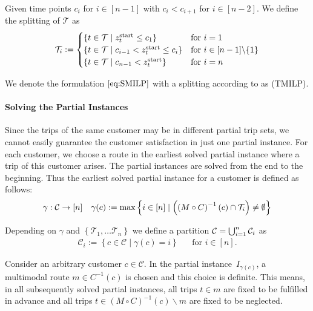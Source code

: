 \begin{definition}
\label{def:time_dependent_splitting}

Given time points $c_i$ for $i\in[n-1]$ with $c_i<c_{i+1}$ for $i\in[n-2]$. We define the splitting of $\mathcal{T}$ as
\begin{align*}
	\mathcal{T}_i := \begin{cases}
		\left\{t\in\mathcal{T}\mid z^{\operatorname{start}}_t\leq c_1\right\} & \text{for } i=1 \\
		\left\{t\in\mathcal{T}\mid c_{i-1}<z^{\operatorname{start}}_t\leq c_i\right\} & \text{for } i\in[n-1]\backslash\{1\} \\
		\left\{t\in\mathcal{T}\mid c_{n-1}<z^{\operatorname{start}}_t\right\} & \text{for } i=n
	\end{cases}
\end{align*}

\end{definition}

We denote the formulation $\eqref{eq:SMILP}$ with a splitting according to  as (TMILP).

\paragraph{Solving the Partial Instances} \parfill

Since the trips of the same customer may be in different partial trip sets, we cannot easily guarantee the customer satisfaction in just one partial instance. For each customer, we choose a route in the earliest solved partial instance where a trip of this customer arises. The partial instances are solved from the end to the beginning. Thus the earliest solved partial instance for a customer is defined as follows:
\begin{align*}
	\gamma: \mathcal{C}\to[n] && \gamma(c) := \max\left\{i\in[n]\mid\left(\left(M\circ C\right)^{-1}(c)\cap\mathcal{T}_i\right)\neq\emptyset\right\}
\end{align*}

Depending on $\gamma$ and $\left\{\mathcal{T}_1,\dots\mathcal{T}_n\right\}$ we define a partition ${\mathcal{C}=\bigcup_{i=1}^n \mathcal{C}_i}$ as
\begin{align*}
	\mathcal{C}_i := \left\{c\in\mathcal{C}\mid \gamma(c)=i\right\} && \text{for } i\in[n].
\end{align*}

Consider an arbitrary customer $c\in\mathcal{C}$. In the partial instance~$I_{\gamma(c)}$, a multimodal route $m\in C^{-1}(c)$ is chosen and this choice is definite. This means, in all subsequently solved partial instances, all trips ${t\in m}$ are fixed to be fulfilled in advance and all trips ${t\in(M\circ C)^{-1}(c)\backslash m}$ are fixed to be neglected.

